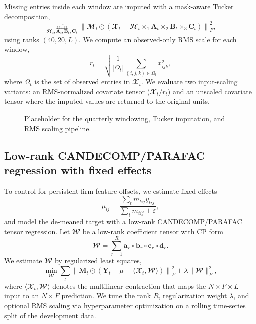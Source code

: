 Missing entries inside each window are imputed with a mask-aware Tucker decomposition,
\begin{equation}
\min_{\mathbfcal{H}_t,\mathbf{A}_t,\mathbf{B}_t,\mathbf{C}_t}
\left\| \mathbfcal{M}_t \odot \left(\mathbfcal{X}_t -
\mathbfcal{H}_t \times_1 \mathbf{A}_t \times_2 \mathbf{B}_t \times_3 \mathbf{C}_t \right) \right\|_F^2,
\end{equation}
using ranks $(40,20,L)$. We compute an observed-only RMS scale for each window,
\begin{equation}
r_t = \sqrt{\frac{1}{|\Omega_t|}\sum_{(i,j,k)\in\Omega_t} x_{ijk}^2},
\end{equation}
where $\Omega_t$ is the set of observed entries in $\mathbfcal{X}_t$. We
evaluate two input-scaling variants: an RMS-normalized covariate tensor
($\mathbfcal{X}_t / r_t$) and an unscaled covariate tensor where the imputed
values are returned to the original units.

\begin{figure}[ht]
\centering
\fbox{\rule{0pt}{2.2in}\rule{0.9\linewidth}{0pt}}
\caption[Placeholder for tensor windowing and imputation.]{Placeholder for the quarterly windowing, Tucker imputation, and RMS scaling pipeline.}
\label{Fig:Imputer_Pipeline}
\end{figure}

\subsection{Low-rank CANDECOMP/PARAFAC regression with fixed effects}
\label{Section:CP_Structured}

To control for persistent firm-feature offsets, we estimate fixed effects
\begin{equation}
\mu_{ij} = \frac{\sum_t m_{tij} y_{tij}}{\sum_t m_{tij} + \varepsilon},
\end{equation}
and model the de-meaned target with a low-rank CANDECOMP/PARAFAC tensor
regression. Let $\mathbfcal{W}$ be a low-rank coefficient tensor with CP form
\begin{equation}
\mathbfcal{W} = \sum_{r=1}^{R} \mathbf{a}_r \circ \mathbf{b}_r \circ \mathbf{c}_r \circ \mathbf{d}_r.
\end{equation}
We estimate $\mathbfcal{W}$ by regularized least squares,
\begin{equation}
\min_{\mathbfcal{W}}
\sum_t \left\| \mathbf{M}_t \odot \left(\mathbf{Y}_t - \mu - \langle \mathbfcal{X}_t, \mathbfcal{W} \rangle \right) \right\|_F^2
+ \lambda \|\mathbfcal{W}\|_F^2,
\end{equation}
where $\langle \mathbfcal{X}_t, \mathbfcal{W} \rangle$ denotes the multilinear contraction that maps the $N \times F \times L$ input to an $N \times F$ prediction. We tune the rank $R$, regularization weight $\lambda$, and optional RMS scaling via hyperparameter optimization on a rolling time-series split of the development data.

